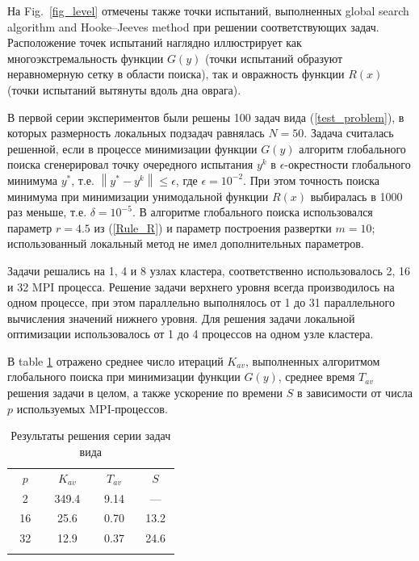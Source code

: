 \documentclass{svproc}
\begin{document}
На Fig.~\ref{fig_level} отмечены также точки испытаний, выполненных global search algorithm and Hooke--Jeeves method при решении соответствующих задач. Расположение точек испытаний наглядно иллюстрирует как многоэкстремальность функции $G(y)$ (точки испытаний образуют неравномерную сетку в области поиска), так и овражность функции $R(x)$ (точки испытаний вытянуты вдоль дна оврага).


В первой серии экспериментов были решены 100 задач вида (\ref{test_problem}), в которых размерность локальных подзадач равнялась $N=50$.
Задача считалась решенной, если в процессе минимизации функции $G(y)$ алгоритм глобального поиска сгенерировал точку очередного испытания $y^k$ в $\epsilon$-окрестности глобального минимума $y^*$, т.е. $\left\|y^* - y^k\right\|\leq\epsilon$, где $\epsilon = 10^{-2}$. 
При этом точность поиска минимума при минимизации унимодальной функции $R(x)$ выбиралась в 1000 раз меньше, т.е. $\delta = 10^{-5}$.
В алгоритме глобального поиска использовался параметр $r=4.5$ из (\ref{Rule_R}) и параметр построения развертки $m=10$; использованный локальный метод не имел дополнительных параметров.


Задачи решались на 1, 4 и 8 узлах кластера, соответственно использовалось 2, 16 и 32 MPI процесса. Решение задачи верхнего уровня всегда производилось на одном процессе, при этом параллельно выполнялось от 1 до 31 параллельного вычисления значений нижнего уровня. Для решения задачи локальной оптимизации использовалось от 1 до 4 процессов на одном узле кластера.

В table \ref{tab1} отражено среднее число итераций $K_{av}$, выполненных алгоритмом глобального поиска при минимизации функции $G(y)$, среднее время $T_{av}$ решения задачи в целом, а также ускорение по времени $S$  в зависимости от числа $p$ используемых MPI-процессов. 

\begin{table}
\centering
\caption{Результаты решения серии задач вида}\label{tab1}
\begin{tabular}{cccc}
\hline\noalign{\smallskip}
 $\;\;\;p\;\;\;$  &  $\;\;\;K_{av}\;\;\;$ &  $\;\;\;T_{av}\;\;\;$ & $\;\;\;S\;\;\;$ \\
\noalign{\smallskip}\hline\noalign{\smallskip}
 2  & 349.4  & 9.14 & ---  \\
 16 & 25.6   & 0.70 & 13.2 \\
 32 & 12.9   & 0.37 & 24.6 \\
\noalign{\smallskip}\hline
\end{tabular}
\end{table}
\end{document}
